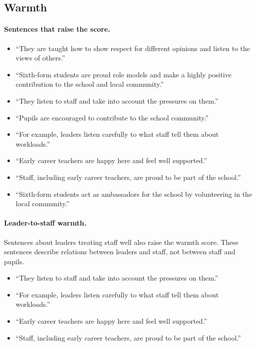 \subsection*{Warmth}
\paragraph{Sentences that raise the score.}
\begin{itemize}
  \item ``They are taught how to show respect for different opinions and listen to the views of others.''
  \item ``Sixth-form students are proud role models and make a highly positive contribution to the school and local community.''
  \item ``They listen to staff and take into account the pressures on them.''
  \item ``Pupils are encouraged to contribute to the school community.''
  \item ``For example, leaders listen carefully to what staff tell them about workloads.''
  \item ``Early career teachers are happy here and feel well supported.''
  \item ``Staff, including early career teachers, are proud to be part of the school.''
  \item ``Sixth-form students act as ambassadors for the school by volunteering in the local community.''
\end{itemize}
\paragraph{Leader-to-staff warmth.}
Sentences about leaders treating staff well also raise the warmth score. These sentences describe relations between leaders and staff, not between staff and pupils.
\begin{itemize}
  \item ``They listen to staff and take into account the pressures on them.''
  \item ``For example, leaders listen carefully to what staff tell them about workloads.''
  \item ``Early career teachers are happy here and feel well supported.''
  \item ``Staff, including early career teachers, are proud to be part of the school.''
\end{itemize}
